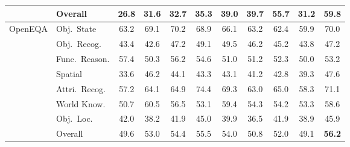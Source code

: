\begin{table}[t]
{\begin{tabular}{ll|ccccccccc}
              \rowcolor{gray!20}
              & Overall  & 26.8 & 31.6 & 32.7 & 35.3 & 39.0 & 39.7 & 55.7 & 31.2 & \textbf{59.8} \\
            \midrule
            \multirow{8}{*}{OpenEQA}
              & Obj.\ State      & 63.2 & 69.1 & 70.2 & 68.9 & 66.1 & 63.2 & 62.4 & 59.9 & 70.0 \\
              & Obj.\ Recog.     & 43.4 & 42.6 & 47.2 & 49.1 & 49.5 & 46.2 & 45.2 & 43.8 & 47.2 \\
              & Func.\ Reason.   & 57.4 & 50.3 & 56.2 & 54.6 & 51.0 & 51.2 & 52.3 & 50.0 & 53.2 \\
              & Spatial          & 33.6 & 46.2 & 44.1 & 43.3 & 43.1 & 41.2 & 42.8 & 39.3 & 47.6 \\
              & Attri.\ Recog.   & 57.2 & 64.1 & 64.9 & 74.4 & 69.3 & 63.0 & 65.0 & 58.3 & 71.1 \\
              & World Know.      & 50.7 & 60.5 & 56.5 & 53.1 & 59.4 & 54.3 & 54.2 & 53.3 & 58.6 \\
              & Obj.\ Loc.       & 42.0 & 38.2 & 41.9 & 45.0 & 39.9 & 36.5 & 41.9 & 38.9 & 45.9 \\
              \rowcolor{gray!20}
              & Overall          & 49.6 & 53.0 & 54.4 & 55.5 & 54.0 & 50.8 & 52.0 & 49.1 & \textbf{56.2} \\
            \bottomrule
        \end{tabular}
    }
\end{table}